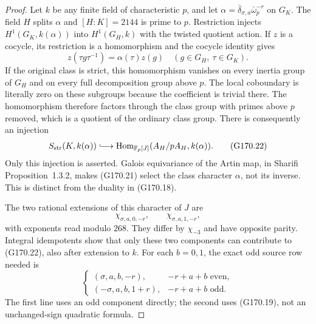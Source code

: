 \begin{proof}
Let $k$ be any finite field of characteristic $p$, and let
$\alpha=\bar\delta_{\sigma,a}\bar\omega_p^{-r}$ on $G_K$.
The field $H$ splits $\alpha$ and $[H:K]=2144$ is prime to $p$.
Restriction injects $H^1(G_K,k(\alpha))$ into
$H^1(G_H,k)$ with the twisted quotient action.
If $z$ is a cocycle, its restriction is a homomorphism and
the cocycle identity gives
\[
           z(\tau g\tau^{-1})=\alpha(\tau)z(g)
                    \quad(g\in G_H,\ \tau\in G_K).
 \tag{G170.21}
\]
If the original class is strict, this homomorphism vanishes
on every inertia group of $G_H$ and on every full decomposition
group above $p$.  The local coboundary is literally zero on
these subgroups because the coefficient is trivial there.
The homomorphism therefore factors through the class group
with primes above $p$ removed, which is a quotient of the
ordinary class group.  There is consequently an injection
\[
 S_{\rm str}(K,k(\alpha))\lhook\joinrel\longrightarrow
       \operatorname{Hom}_{\mathbb F_p[J]}
                         (A_H/pA_H,k(\alpha)).
 \tag{G170.22}
\]
Only this injection is asserted.  Galois equivariance of the
Artin map, in Sharifi Proposition~1.3.2, makes (G170.21)
select the class character $\alpha$, not its inverse.
This is distinct from the duality in (G170.18).

The two rational extensions of this character of $J$ are
\[
               \chi_{\sigma,a,0,-r},\qquad
               \chi_{\sigma,a,1,-r},
 \tag{G170.23}
\]
with exponents read modulo $268$.
They differ by $\chi_{-3}$ and have opposite parity.
Integral idempotents show that only these two components
can contribute to (G170.22), also after extension to $k$.
For each $b=0,1$, the exact odd source row needed is
\[
 \begin{cases}
 (\sigma,a,b,-r),&-r+a+b\text{ even},\\
 (-\sigma,a,b,1+r),&-r+a+b\text{ odd}.
 \end{cases}
 \tag{G170.24}
\]
The first line uses an odd component directly; the second
uses (G170.19), not an unchanged-sign quadratic formula.


\end{proof}
